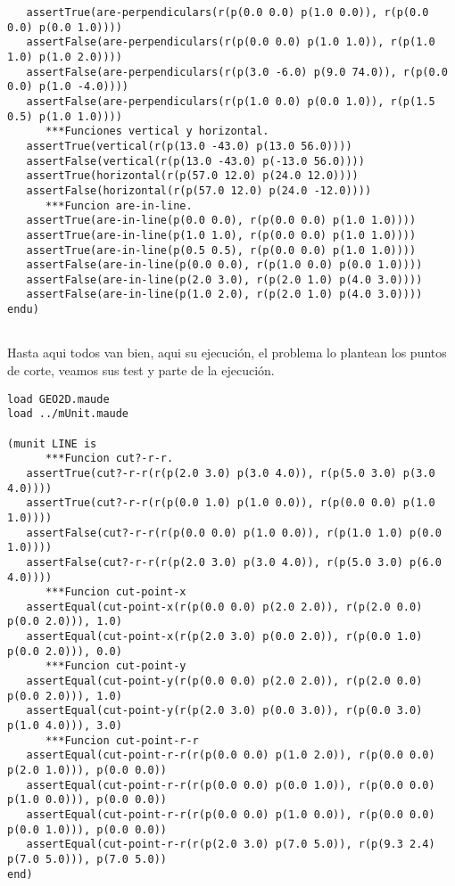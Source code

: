 \begin{verbatim}
   assertTrue(are-perpendiculars(r(p(0.0 0.0) p(1.0 0.0)), r(p(0.0 0.0) p(0.0 1.0))))
   assertFalse(are-perpendiculars(r(p(0.0 0.0) p(1.0 1.0)), r(p(1.0 1.0) p(1.0 2.0))))
   assertFalse(are-perpendiculars(r(p(3.0 -6.0) p(9.0 74.0)), r(p(0.0 0.0) p(1.0 -4.0))))
   assertFalse(are-perpendiculars(r(p(1.0 0.0) p(0.0 1.0)), r(p(1.5 0.5) p(1.0 1.0))))
      ***Funciones vertical y horizontal.
   assertTrue(vertical(r(p(13.0 -43.0) p(13.0 56.0))))
   assertFalse(vertical(r(p(13.0 -43.0) p(-13.0 56.0))))
   assertTrue(horizontal(r(p(57.0 12.0) p(24.0 12.0))))
   assertFalse(horizontal(r(p(57.0 12.0) p(24.0 -12.0))))
      ***Funcion are-in-line.
   assertTrue(are-in-line(p(0.0 0.0), r(p(0.0 0.0) p(1.0 1.0))))
   assertTrue(are-in-line(p(1.0 1.0), r(p(0.0 0.0) p(1.0 1.0))))
   assertTrue(are-in-line(p(0.5 0.5), r(p(0.0 0.0) p(1.0 1.0))))
   assertFalse(are-in-line(p(0.0 0.0), r(p(1.0 0.0) p(0.0 1.0))))
   assertFalse(are-in-line(p(2.0 3.0), r(p(2.0 1.0) p(4.0 3.0))))
   assertFalse(are-in-line(p(1.0 2.0), r(p(2.0 1.0) p(4.0 3.0))))
endu)
	
\end{verbatim}

Hasta aqui todos van bien, aqui su ejecuci\'on, el problema lo plantean los puntos de corte, veamos sus test y parte de la ejecuci\'on.

\begin{verbatim}
load GEO2D.maude
load ../mUnit.maude

(munit LINE is
      ***Funcion cut?-r-r.
   assertTrue(cut?-r-r(r(p(2.0 3.0) p(3.0 4.0)), r(p(5.0 3.0) p(3.0 4.0))))
   assertTrue(cut?-r-r(r(p(0.0 1.0) p(1.0 0.0)), r(p(0.0 0.0) p(1.0 1.0))))
   assertFalse(cut?-r-r(r(p(0.0 0.0) p(1.0 0.0)), r(p(1.0 1.0) p(0.0 1.0))))
   assertFalse(cut?-r-r(r(p(2.0 3.0) p(3.0 4.0)), r(p(5.0 3.0) p(6.0 4.0))))
      ***Funcion cut-point-x
   assertEqual(cut-point-x(r(p(0.0 0.0) p(2.0 2.0)), r(p(2.0 0.0) p(0.0 2.0))), 1.0)
   assertEqual(cut-point-x(r(p(2.0 3.0) p(0.0 2.0)), r(p(0.0 1.0) p(0.0 2.0))), 0.0)
      ***Funcion cut-point-y
   assertEqual(cut-point-y(r(p(0.0 0.0) p(2.0 2.0)), r(p(2.0 0.0) p(0.0 2.0))), 1.0)
   assertEqual(cut-point-y(r(p(2.0 3.0) p(0.0 3.0)), r(p(0.0 3.0) p(1.0 4.0))), 3.0)
      ***Funcion cut-point-r-r
   assertEqual(cut-point-r-r(r(p(0.0 0.0) p(1.0 2.0)), r(p(0.0 0.0) p(2.0 1.0))), p(0.0 0.0))
   assertEqual(cut-point-r-r(r(p(0.0 0.0) p(0.0 1.0)), r(p(0.0 0.0) p(1.0 0.0))), p(0.0 0.0))
   assertEqual(cut-point-r-r(r(p(0.0 0.0) p(1.0 0.0)), r(p(0.0 0.0) p(0.0 1.0))), p(0.0 0.0))
   assertEqual(cut-point-r-r(r(p(2.0 3.0) p(7.0 5.0)), r(p(9.3 2.4) p(7.0 5.0))), p(7.0 5.0))
end)
\end{verbatim}

